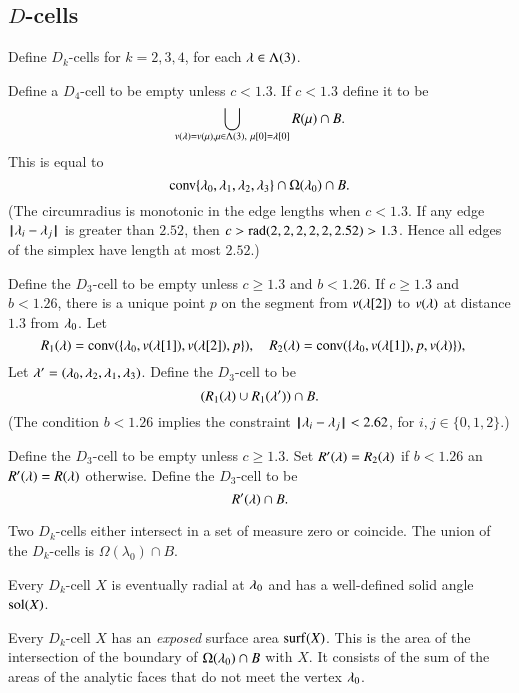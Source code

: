 \subsection{$D$-cells}

Define $D_k$-cells for $k=2,3,4$, for each $\lambda\in\Lambda(3)$.
%
%

  Define a $D_4$-cell to be empty unless $c<1.3$.  If $c<1.3$ define it to be
  $$
  \bigcup_{v(\lambda)=v(\mu), \mu\in \Lambda(3),\ \mu[0]=\lambda[0]}  R(\mu)\cap B.
$$
This is equal to
$$
{\operatorname{conv}}\{\lambda_0,\lambda_1,\lambda_2,\lambda_3\} \cap \Omega(\lambda_0)\cap B.
$$
(The circumradius is monotonic in the edge lengths when $c<1.3$.
If any edge ${\hskip0.1em|\hskip-0.15em|\hskip0.1em}\lambda_i - \lambda_j{\hskip0.1em|\hskip-0.15em|\hskip0.1em}$ is greater than $2.52$, then
$c > {\operatorname{rad}}(2,2,2,2,2,2.52) > 1.3$.  Hence all edges of the simplex have length at most $2.52$.)
%

 Define the $D_3$-cell to be empty unless $c\ge 1.3$ and $b< 1.26$.  If $c \ge 1.3$ and $b< 1.26$, there is a unique point $p$
on the segment from $v(\lambda[2])$ to $v(\lambda)$ at distance $1.3$ from $\lambda_0$.  Let 
$$
R_1(\lambda) = {\operatorname{conv}}(\{\lambda_0,v(\lambda[1]),v(\lambda[2]),p\} ),\quad
R_2(\lambda) = {\operatorname{conv}}(\{\lambda_0,v(\lambda[1]),p,v(\lambda)\} ),\quad
$$
Let $\lambda' = (\lambda_0,\lambda_2,\lambda_1,\lambda_3)$.
Define the $D_3$-cell to be
$$
(R_1(\lambda) \cup R_1(\lambda'))\cap B.
$$
(The condition $b< 1.26$ implies the constraint ${\hskip0.1em|\hskip-0.15em|\hskip0.1em}\lambda_i - \lambda_j{\hskip0.1em|\hskip-0.15em|\hskip0.1em}< 2.62$, for $i,j\in\{0,1,2\}$.)

 Define the $D_3$-cell to be empty unless $c\ge 1.3$.
Set $R'(\lambda) = R_2(\lambda)$ if $b< 1.26$ an $R'(\lambda) = R(\lambda)$
otherwise.  Define the $D_3$-cell to be
$$
R'(\lambda) \cap B.
$$

\begin{lemma}  Two $D_k$-cells either intersect in a set of measure zero or coincide.  The union of the $D_k$-cells is $\Omega(\lambda_0)\cap B$.
\end{lemma}
%

Every $D_k$-cell $X$ is eventually radial at $\lambda_0$ and has
a well-defined solid angle $\operatorname{sol}(X)$.
%

Every $D_k$-cell $X$ has an {\it exposed} surface area ${\operatorname{surf}}(X)$.
This is the area of the intersection of the boundary of 
$\Omega(\lambda_0)\cap B$ with $X$.  It consists of the sum of the
areas of the analytic faces that do not meet the vertex $\lambda_0$.
%
%
%

